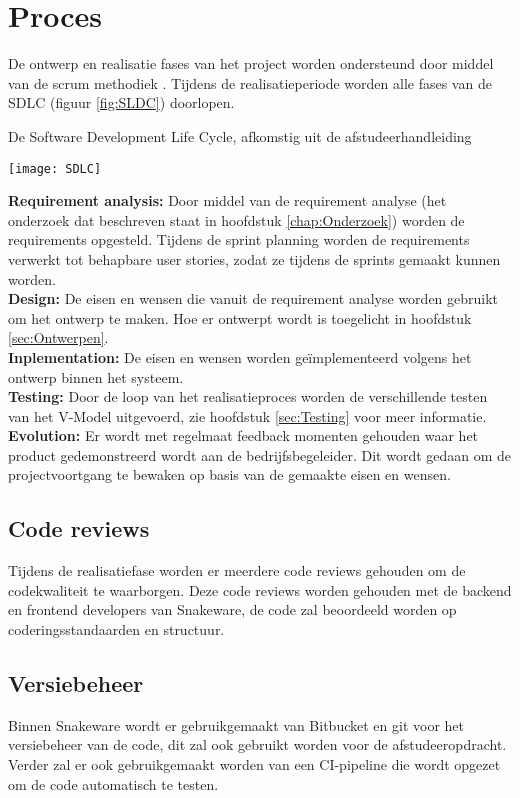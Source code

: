 \section{Proces}
De ontwerp en realisatie fases van het project worden ondersteund door middel van de scrum methodiek \Parencite{Scrum}.
Tijdens de realisatieperiode worden alle fases van de \gls{SDLC} (figuur \ref{fig:SLDC}) doorlopen.\\
\begin{graphic}
    \vspace{0.2cm}
    \captionsetup{type=figure}
    \caption{De Software Development Life Cycle, afkomstig uit de afstudeerhandleiding \Parencite{Afstudeerhandleiding}} %
    \texttt{[image: SDLC]}
    \label{fig:SLDC}
    \vspace{0.2cm}
\end{graphic}
\textbf{Requirement analysis:} Door middel van de requirement analyse (het onderzoek dat beschreven staat in hoofdstuk \ref{chap:Onderzoek}) worden de requirements opgesteld.
Tijdens de sprint planning worden de requirements verwerkt tot behapbare user stories, zodat ze tijdens de sprints gemaakt kunnen worden.\\
\textbf{Design:} De eisen en wensen die vanuit de requirement analyse worden gebruikt om het ontwerp te maken.
Hoe er ontwerpt wordt is toegelicht in hoofdstuk \ref{sec:Ontwerpen}.\\
\textbf{Inplementation:}
De eisen en wensen worden geïmplementeerd volgens het ontwerp binnen het systeem.\\
\textbf{Testing:} Door de loop van het realisatieproces worden de verschillende testen van het V-Model uitgevoerd, zie hoofdstuk \ref{sec:Testing} voor meer informatie.\\
\textbf{Evolution:} Er wordt met regelmaat feedback momenten gehouden waar het product gedemonstreerd wordt aan de bedrijfsbegeleider.
Dit wordt gedaan om de projectvoortgang te bewaken op basis van de gemaakte eisen en wensen.
\subsection{Code reviews}
Tijdens de realisatiefase worden er meerdere code reviews gehouden om de codekwaliteit te waarborgen.
Deze code reviews worden gehouden met de backend en frontend developers van Snakeware, de code zal beoordeeld worden op coderingsstandaarden en structuur.
\subsection{Versiebeheer}
Binnen Snakeware wordt er gebruikgemaakt van Bitbucket \Parencite{BitBucket} en git \Parencite{Git} voor het versiebeheer van de code, dit zal ook gebruikt worden voor de afstudeeropdracht.
Verder zal er ook gebruikgemaakt worden van een CI-pipeline die wordt opgezet om de code automatisch te testen.
